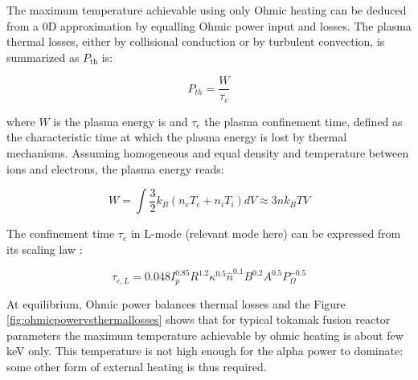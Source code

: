 The maximum temperature achievable using only Ohmic heating can be deduced from a 0D approximation by equalling Ohmic power input and losses. The plasma thermal losses, either by collisional conduction or by turbulent convection, is summarized as $P_{\mathrm{th}}$ is:

\begin{equation}\label{eq:plasma_thermal_losses}
P_{th} = \frac{W}{\tau_e}
\end{equation}

where $W$ is the plasma energy is and $\tau_e$ the plasma confinement time, defined as the characteristic time at which the plasma energy is lost by thermal mechanisms. Assuming homogeneous and equal density and temperature between ions and electrons, the plasma energy reads: 

\begin{equation}\label{eq:plasma_energy}
W 
= \int \frac{3}{2} k_B (n_e T_e + n_i T_i) dV 
\approx 3 n k_B T V
\end{equation}

The confinement time $\tau_e$ in L-mode (relevant mode here) can be expressed from its scaling law \cite[Eq.(14.155)]{Freidberg2007}:

\begin{equation}\label{eq:tau_e_modeL}
\tau_{e,L}
=
0.048  I_p^{0.85} R^{1.2} \kappa^{0.5} \hat n^{0.1} B^{0.2} A^{0.5} P_\Omega^{-0.5}
\end{equation}  

At equilibrium, Ohmic power balances thermal losses and the Figure \ref{fig:ohmicpowervsthermallosses} shows that for typical tokamak fusion reactor parameters
the maximum temperature achievable by ohmic heating is about few keV only. This temperature is not high enough for the alpha power to dominate: some other form of external heating is thus required. 

